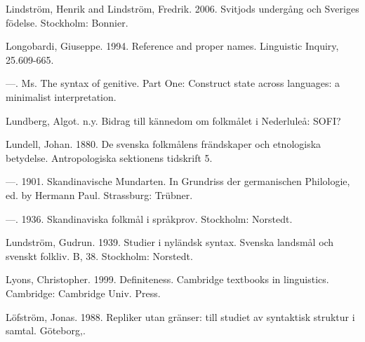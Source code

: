 Lindström, Henrik and Lindström, Fredrik. 2006. Svitjods undergång och Sveriges födelse. Stockholm: Bonnier.


Longobardi, Giuseppe. 1994. Reference and proper names. Linguistic Inquiry, 25.609-665.


—. Ms. The syntax of genitive. Part One: Construct state across languages: a minimalist interpretation.


Lundberg, Algot. n.y. Bidrag till kännedom om folkmålet i Nederluleå: SOFI?


Lundell, Johan. 1880. De svenska folkmålens frändskaper och etnologiska betydelse. Antropologiska sektionens tidskrift 5.


—. 1901. Skandinavische Mundarten. In Grundriss der germanischen Philologie, ed. by Hermann Paul. Strassburg: Trübner.


—.  1936. Skandinaviska folkmål i språkprov. Stockholm: Norstedt.


Lundström, Gudrun. 1939. Studier i nyländsk syntax. Svenska landsmål och svenskt folkliv. B, 38. Stockholm: Norstedt.


Lyons, Christopher. 1999. Definiteness. Cambridge textbooks in linguistics. Cambridge: Cambridge Univ. Press.


Löfström, Jonas. 1988. Repliker utan gränser: till studiet av syntaktisk struktur i samtal. Göteborg,.


